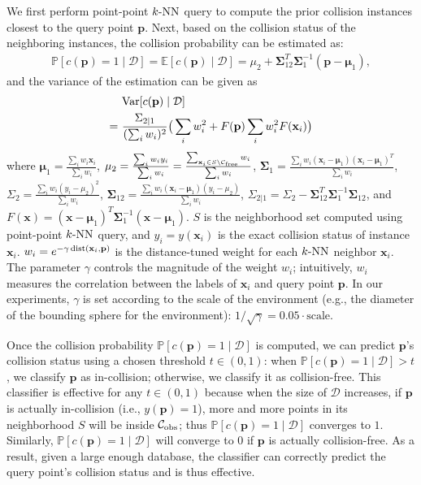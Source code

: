 We first perform point-point $k\text{-NN}$ query to compute the prior collision instances closest to the query point $\mathbf p$. Next, based on the collision status of the neighboring instances, the collision probability can be estimated as:
\begin{align}
  \label{eq:3:knnclassifier}
  \mathbb P[c(\mathbf p) = 1 \mid \mathcal D] = \mathbb E[c(\mathbf p) \mid \mathcal D] = \mu_2 + \boldsymbol \Sigma_{12}^T  \boldsymbol\Sigma_1^{-1} (\mathbf p - \boldsymbol \mu_1),
\end{align}
and the variance of the estimation can be given as
\begin{align}
\label{eq:3:knnclassifiervar}
& \ \textrm{Var}[c(\mathbf p) \mid \mathcal D] \\ \notag
=& \ \frac{\Sigma_{2|1}}{(\sum_i w_i)^2} \big( \sum_i w_i^2 + F(\mathbf p) \sum_i w_i^2 F(\mathbf x_i) \big)
\end{align}
where $\boldsymbol \mu_1 = \frac{\sum_i w_i \mathbf x_i}{\sum_i w_i}$, $\mu_2 = \frac{\sum_i w_i y_i}{\sum_i w_i} = \frac{\sum_{\mathbf x_i \in S \setminus \mathcal C_{\text{free}}}w_i}{\sum_i w_i}$, $\boldsymbol \Sigma_1 = \frac{\sum_i w_i (\mathbf x_i - \boldsymbol \mu_1)(\mathbf x_i - \boldsymbol \mu_1)^T}{\sum_i w_i}$, $\Sigma_2 = \frac{\sum_i w_i (y_i - \mu_2)^2}{\sum_i w_i}$, $\boldsymbol \Sigma_{12} = \frac{\sum_i w_i (\mathbf x_i - \boldsymbol \mu_1)(y_i - \mu_2)}{\sum_i w_i}$, $\Sigma_{2|1} = \Sigma_2 - \boldsymbol \Sigma_{12}^T \boldsymbol \Sigma_1^{-1} \boldsymbol \Sigma_{12}$, and $F(\mathbf x) = (\mathbf x - \boldsymbol \mu_1)^T \boldsymbol \Sigma_1^{-1} (\mathbf x - \boldsymbol \mu_1)$.
$S$ is the neighborhood set computed using point-point $k\text{-NN}$ query, and $y_i = y(\mathbf x_i)$ is the exact collision status of instance $\mathbf x_i$. $w_i = e^{-\gamma \operatorname{dist}(\mathbf x_i, \mathbf p)}$ is the distance-tuned weight for each $k\text{-NN}$ neighbor $\mathbf x_i$. The parameter $\gamma$ controls the magnitude of the weight $w_i$; intuitively, $w_i$ measures the
correlation between the labels of $\mathbf x_i$ and query point $\mathbf p$. In our experiments, $\gamma$ is set according to the scale of the environment (e.g., the diameter of the bounding sphere for the environment): $1/\sqrt{\gamma} = 0.05 \cdot \text{scale}$.

Once the collision probability $\mathbb P[c(\mathbf p) = 1 \mid \mathcal D]$ is computed, we can predict $\mathbf p$'s collision status using a chosen threshold $t \in (0, 1)$: when $\mathbb P[c(\mathbf p) = 1 \mid \mathcal D] > t$, we classify $\mathbf p$ as in-collision; otherwise, we classify it as collision-free. This classifier is effective for any $t \in (0, 1)$ because when the size of $\mathcal D$ increases, if $\mathbf p$ is actually in-collision (i.e., $y(\mathbf p) = 1$), more and more points in its neighborhood $S$ will be inside $\mathcal C_{\text{obs}}$; thus $\mathbb P[c(\mathbf p) = 1 \mid \mathcal D]$ converges to $1$. Similarly, $\mathbb P[c(\mathbf p) = 1 \mid \mathcal D]$ will converge to $0$ if $\mathbf p$ is actually collision-free. As a result, given a large enough database, the classifier can correctly predict the query point's collision status and is thus effective.

